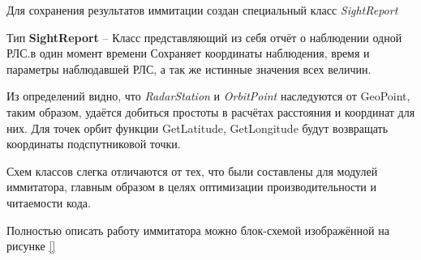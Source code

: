 Для сохранения результатов иммитации создан специальный класс \textit{SightReport}
\begin{mydef} \label{typ:SightReport}
Тип \textbf{SightReport} -- Класс представляющий из себя отчёт о наблюдении одной РЛС.в один момент времени
Сохраняет координаты наблюдения, время и параметры наблюдавшей РЛС, а так же истинные значения всех величин.
\end{mydef}

Из определений видно, что \textit{RadarStation} и \textit{OrbitPoint} наследуются от GeoPoint, таким образом, удаётся
добиться простоты в расчётах расстояния и координат для них. Для точек орбит функции GetLatitude, GetLongitude будут 
возвращать координаты подспутниковой точки.

Схем классов слегка отличаются от тех, что были составлены для модулей иммитатора, главным образом в целях оптимизации производительности и читаемости кода.

Полностью описать работу иммитатора можно блок-схемой изображённой на рисунке \ref{}